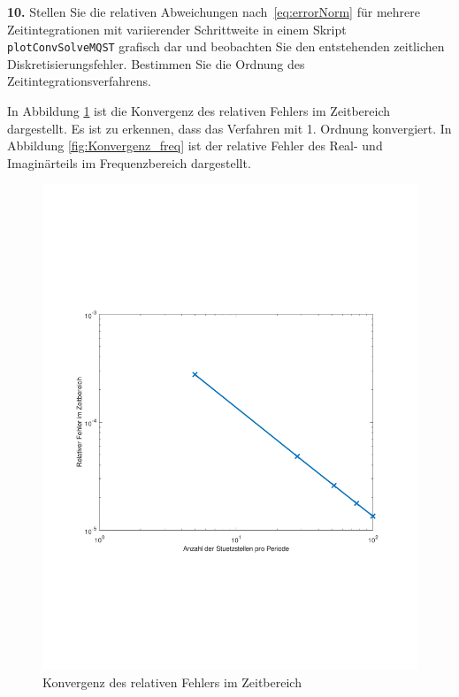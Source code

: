 \documentclass[Protokollheft.tex]{subfiles}
\begin{document}
  \begin{framed}
	\noindent \textbf{10.} Stellen Sie die relativen Abweichungen nach~\eqref{eq:errorNorm} für mehrere Zeitintegrationen mit
      variierender Schrittweite in einem Skript \lstinline{plotConvSolveMQST} grafisch dar und beobachten Sie den entstehenden zeitlichen Diskretisierungsfehler. Bestimmen Sie die Ordnung des Zeitintegrationsverfahrens.\label{exer:relDiffMQSFvsMQST}
\end{framed}
\noindent
In Abbildung \ref{fig:Konvergenz_time} ist die Konvergenz des relativen Fehlers im Zeitbereich dargestellt. Es ist zu erkennen, dass das Verfahren mit 1. Ordnung konvergiert. In Abbildung \ref{fig:Konvergenz_freq} ist der relative Fehler des Real- und Imaginärteils im Frequenzbereich dargestellt.
\begin{figure}[h]
	\centering
	\includegraphics[trim = 15mm 65mm 15mm 65mm, clip,width=0.7\linewidth]{Konvergenz_time.pdf}
	\caption{Konvergenz des relativen Fehlers im Zeitbereich}
	\label{fig:Konvergenz_time}
\end{figure}
\end{document}
